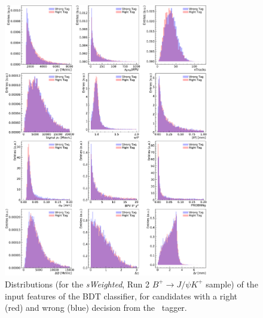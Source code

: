 \begin{figure}[htbp]
        \begin{center}
        \includegraphics[width=0.8\textwidth]{04Flavourtagging/figs/OSelectronOpt/2017-12-12-vibattis-OSElectron-bdt-calibration-sWeights_Run2/FeaturesDistribution_RunIIcuts.pdf}
        \end{center}
        \vspace{-2mm}
         \caption{Distributions (for the \emph{sWeighted}, Run 2 $B^+\to J/\psi K^+$ sample) of the input features of the BDT classifier, for candidates with a right (red) and wrong (blue) decision from the \OSe~tagger.}
         \label{fig:OSefeaturesRunIIB2CC}
\end{figure}

